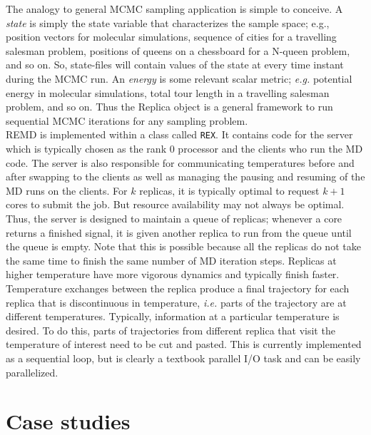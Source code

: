 \documentclass[12pt,letterpaper]{article}
\begin{document}
\noindent The analogy to general MCMC sampling application is simple to conceive. A \textit{state} is simply the state variable that characterizes the sample space; e.g., position vectors for molecular simulations, sequence of cities for a travelling salesman problem, positions of queens on a chessboard for a N-queen problem, and so on. So, state-files will contain values of the state at every time instant during the MCMC run. An \textit{energy} is some relevant scalar metric; \textit{e.g.} potential energy in molecular simulations, total tour length in a travelling salesman problem, and so on. Thus the Replica object is a general framework to run sequential MCMC iterations for any sampling problem.\\

\noindent REMD is implemented within a class called \texttt{REX}. It contains code for the server which is typically chosen as the rank 0 processor and the clients who run the MD code. The server is also responsible for communicating temperatures before and after swapping to the clients as well as managing the pausing and resuming of the MD runs on the clients. For $k$ replicas, it is typically optimal to request $k+1$ cores to submit the job. But resource availability may not always be optimal. Thus, the server is designed to maintain a queue of replicas; whenever a core returns a finished signal, it is given another replica to run from the queue until the queue is empty. Note that this is possible because all the replicas do not take the same time to finish the same number of MD iteration steps. Replicas at higher temperature have more vigorous dynamics and typically finish faster.\\

\noindent Temperature exchanges between the replica produce a final trajectory for each replica that is discontinuous in temperature, \textit{i.e.} parts of the trajectory are at different temperatures. Typically, information at a particular temperature is desired. To do this, parts of trajectories from different replica that visit the temperature of interest need to be cut and pasted. This is currently implemented as a sequential loop, but is clearly a textbook parallel I/O task and can be easily parallelized.


\section*{Case studies}
\end{document}
